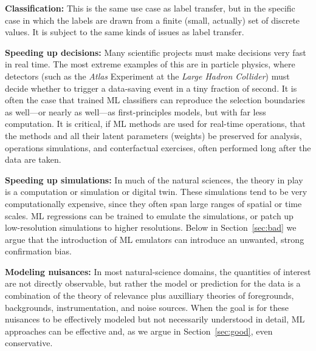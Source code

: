 \documentclass{article}
\renewcommand{\paragraph}[1]{\noindent\par\textbf{#1}}
\newcommand{\sectionname}{Section}
\newcommand{\secref}[1]{\sectionname~\ref{#1}}
\begin{document}
\paragraph{Classification:}
This is the same use case as label transfer, but in the specific case in which the labels are drawn from a finite (small, actually) set of discrete values.
It is subject to the same kinds of issues as label transfer.
  
\paragraph{Speeding up decisions:}
Many scientific projects must make decisions very fast in real time.
The most extreme examples of this are in particle physics, where detectors (such as the \textsl{Atlas} Experiment \cite{atlas} at the \textsl{Large Hadron Collider}) must decide whether to trigger a data-saving event in a tiny fraction of second.
It is often the case that trained ML classifiers can reproduce the selection boundaries as well---or nearly as well---as first-principles models, but with far less computation.
It is critical, if ML methods are used for real-time operations, that the methods and all their latent parameters (weights) be preserved for analysis, operations simulations, and conterfactual exercises, often performed long after the data are taken.

\paragraph{Speeding up simulations:}
In much of the natural sciences, the theory in play is a computation or simulation or digital twin.
These simulations tend to be very computationally expensive, since they often span large ranges of spatial or time scales.
ML regressions can be trained to emulate the simulations, or patch up low-resolution simulations to higher resolutions.
Below in \secref{sec:bad} we argue that the introduction of ML emulators can introduce an unwanted, strong confirmation bias.

\paragraph{Modeling nuisances:}
In most natural-science domains, the quantities of interest are not directly observable, but rather the model or prediction for the data is a combination of the theory of relevance plus auxilliary theories of foregrounds, backgrounds, instrumentation, and noise sources.
When the goal is for these nuisances to be effectively modeled but not necessarily understood in detail, ML approaches can be effective and, as we argue in \secref{sec:good}, even conservative.
\end{document}
